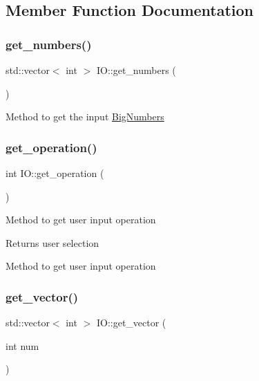 \subsection{Member Function Documentation}
\mbox{\label{classIO_a049d0bb812a8ac48b950f60f4931f344}} 
\subsubsection{\texorpdfstring{get\+\_\+numbers()}{get\_numbers()}}
{\footnotesize\ttfamily std\+::vector$<$ int $>$ I\+O\+::get\+\_\+numbers (\begin{DoxyParamCaption}{ }\end{DoxyParamCaption})}

Method to get the input \mbox{\hyperlink{classBigNumbers}{Big\+Numbers}} \mbox{\label{classIO_accf477f16d55cee9ece47ca7c8f8787c}} 
\subsubsection{\texorpdfstring{get\+\_\+operation()}{get\_operation()}}
{\footnotesize\ttfamily int I\+O\+::get\+\_\+operation (\begin{DoxyParamCaption}{ }\end{DoxyParamCaption})}

Method to get user input operation \begin{DoxyReturn}{Returns}
user selection
\end{DoxyReturn}
Method to get user input operation \mbox{\label{classIO_a83820ab9aabab4a14b1a606966abe7cf}} 
\subsubsection{\texorpdfstring{get\+\_\+vector()}{get\_vector()}}
{\footnotesize\ttfamily std\+::vector$<$ int $>$ I\+O\+::get\+\_\+vector (\begin{DoxyParamCaption}\item[{int}]{num }\end{DoxyParamCaption})}




